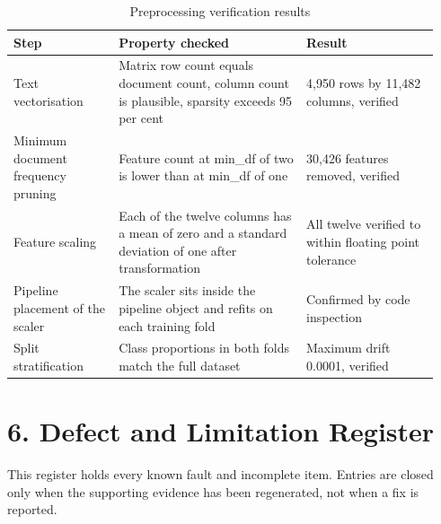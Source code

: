 \documentclass[11pt,a4paper]{article}
\begin{document}
\begin{table}[!t]
\centering
\caption{Preprocessing verification results}
\small
\setlength{\tabcolsep}{3pt}
\begin{tabular}{p{0.230\linewidth}p{0.418\linewidth}p{0.292\linewidth}}
\toprule
\textbf{Step} & \textbf{Property checked} & \textbf{Result} \\
\midrule
Text vectorisation & Matrix row count equals document count, column count is plausible, sparsity exceeds 95 per cent & 4,950 rows by 11,482 columns, verified \\
Minimum document frequency pruning & Feature count at min\_df of two is lower than at min\_df of one & 30,426 features removed, verified \\
Feature scaling & Each of the twelve columns has a mean of zero and a standard deviation of one after transformation & All twelve verified to within floating point tolerance \\
Pipeline placement of the scaler & The scaler sits inside the pipeline object and refits on each training fold & Confirmed by code inspection \\
Split stratification & Class proportions in both folds match the full dataset & Maximum drift 0.0001, verified \\
\bottomrule
\end{tabular}
\end{table}

\section{6. Defect and Limitation Register}
This register holds every known fault and incomplete item. Entries are closed only when the supporting evidence has been regenerated, not when a fix is reported.
\end{document}
